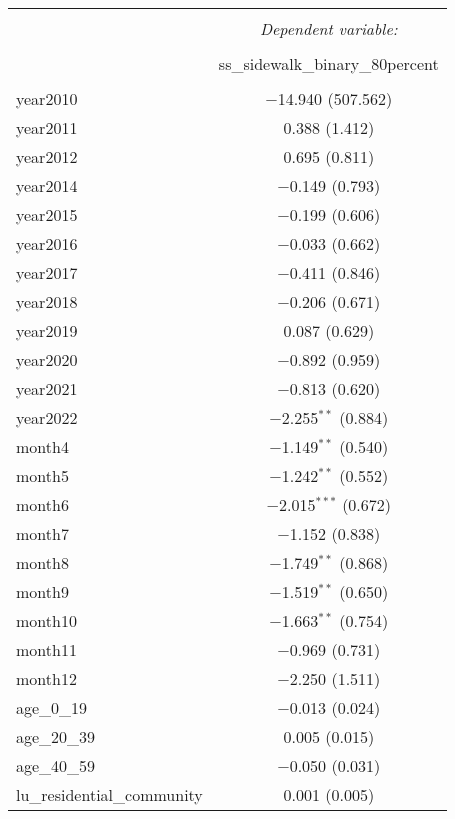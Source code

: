 \begin{table}[!htbp] \centering 
  \caption{} 
  \label{} 
\small 
\begin{tabular}{@{\extracolsep{1pt}}lc} 
\\[-1.8ex]\hline 
\hline \\[-1.8ex] 
 & \multicolumn{1}{c}{\textit{Dependent variable:}} \\ 
\cline{2-2} 
\\[-1.8ex] & ss\_sidewalk\_binary\_80percent \\ 
\hline \\[-1.8ex] 
 year2010 & $-$14.940 (507.562) \\ 
  year2011 & 0.388 (1.412) \\ 
  year2012 & 0.695 (0.811) \\ 
  year2014 & $-$0.149 (0.793) \\ 
  year2015 & $-$0.199 (0.606) \\ 
  year2016 & $-$0.033 (0.662) \\ 
  year2017 & $-$0.411 (0.846) \\ 
  year2018 & $-$0.206 (0.671) \\ 
  year2019 & 0.087 (0.629) \\ 
  year2020 & $-$0.892 (0.959) \\ 
  year2021 & $-$0.813 (0.620) \\ 
  year2022 & $-$2.255$^{**}$ (0.884) \\ 
  month4 & $-$1.149$^{**}$ (0.540) \\ 
  month5 & $-$1.242$^{**}$ (0.552) \\ 
  month6 & $-$2.015$^{***}$ (0.672) \\ 
  month7 & $-$1.152 (0.838) \\ 
  month8 & $-$1.749$^{**}$ (0.868) \\ 
  month9 & $-$1.519$^{**}$ (0.650) \\ 
  month10 & $-$1.663$^{**}$ (0.754) \\ 
  month11 & $-$0.969 (0.731) \\ 
  month12 & $-$2.250 (1.511) \\ 
  age\_0\_19 & $-$0.013 (0.024) \\ 
  age\_20\_39 & 0.005 (0.015) \\ 
  age\_40\_59 & $-$0.050 (0.031) \\ 
  lu\_residential\_community & 0.001 (0.005) \\ 

\end{tabular}
\end{table}

